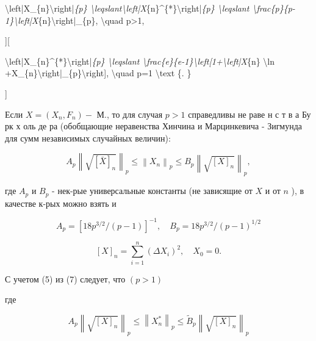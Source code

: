 \documentclass[10pt]{article}
\begin{document}
\textbackslash left|X\_\{n\}\textbackslash right|\textit{\{p\} \textbackslash leqslant\textbackslash left|X}\{n\}\^{}\{*\}\textbackslash right|\textit{\{p\} \textbackslash leqslant \textbackslash frac\{p\}\{p-1\}\textbackslash left|X}\{n\}\textbackslash right|\_\{p\}, \textbackslash quad p>1,



][



\textbackslash left|X\_\{n\}\^{}\{*\}\textbackslash right|\textit{\{p\} \textbackslash leqslant \textbackslash frac\{e\}\{e-1\}\textbackslash left[1+\textbackslash left|X}\{n\} \textbackslash ln +X\_\{n\}\textbackslash right|\_\{p\}\textbackslash right], \textbackslash quad p=1 \textbackslash text \{. \}

]



Если $X=\left(X_{n}, F_{n}\right)-$ М., то для случая $p>1$ справедливы не раве н с т в а Бу рк х оль де ра (обобщающие неравенства Хинчина и Марцинкевича - Зигмунда для сумм независимых случайных величин):



\[

A_{p}\left\|\sqrt{[\bar{X}]_{n}}\right\|_{p} \leqslant\left\|X_{n}\right\|_{p} \leqslant B_{p}\left\|\sqrt{[X]_{n}}\right\|_{p},

\]



где $A_{p}$ и $B_{p}$ - нек-рые универсальные константы (не зависящие от $X$ и от $n$ ), в качестве к-рых можно взять и



\[

A_{p}=\left[18 p^{3 / 2} /(p-1)\right]^{-1}, \quad B_{p}=18 p^{3 / 2} /(p-1)^{1 / 2}

\]



\[

[X]_{n}=\sum_{i=1}^{n}\left(\Delta X_{i}\right)^{2}, \quad X_{0}=0 .

\]



С учетом (5) из (7) следует, что $(p>1)$



где



\[

A_{p}\left\|\sqrt{[X]_{n}}\right\|_{p} \leqslant\left\|X_{n}^{*}\right\|_{p} \leqslant \tilde{B}_{p}\left\|\sqrt{[X]_{n}}\right\|_{p}

\]
\end{document}
